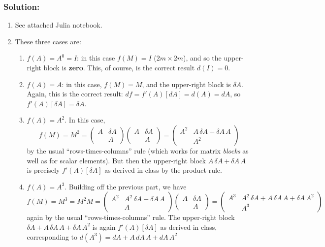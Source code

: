 \documentclass[10pt,oneside]{article}
\begin{document}
\subsubsection*{Solution:}

\begin{enumerate}

    \item See attached Julia notebook. 

    \item These three cases are:
    \begin{enumerate}
    \item $f(A) = A^0 = I$: in this case $f(M) = I$ ($2m \times 2m$), and so the upper-right block is \textbf{zero}.  This, of course, is the correct result $d(I) = 0$.
    \item $f(A) = A$: in this case, $f(M) = M$, and the upper-right block is $\delta A$.  Again, this is the correct result: $df = f'(A)[dA] = d(A) = dA$, so $f'(A)[\delta A] = \delta A$.
    \item $f(A) = A^2$.  In this case, 
    $$
    f(M) = M^2 = \begin{pmatrix} A & \delta A \\ & A \end{pmatrix} \begin{pmatrix} A & \delta A \\ & A \end{pmatrix} = \begin{pmatrix} A^2 & A \, \delta A + \delta A \, A \\ & A^2 \end{pmatrix}
    $$
    by the usual ``rows-times-columns'' rule (which works for matrix \emph{blocks} as well as for scalar elements).  But then the upper-right block $A \, \delta A + \delta A \, A$ is precisely $f'(A)[\delta A]$ as derived in class by the product rule.
    
    \item $f(A) = A^3$.  Building off the previous part, we have 
    $$
    f(M) = M^3 = M^2 M = \begin{pmatrix} A^2 & A^2 \, \delta A + \delta A \, A \\ & A \end{pmatrix} \begin{pmatrix} A & \delta A \\ & A \end{pmatrix} = \begin{pmatrix} A^3 & A^2 \, \delta A + A \, \delta A \, A + \delta A \, A^2 \\ & A^3 \end{pmatrix}
    $$
    again by the usual ``rows-times-columns'' rule.  The upper-right block $\delta A + A \, \delta A \, A + \delta A \, A^2$ is again  $f'(A)[\delta A]$ as derived in class, corresponding to $d(A^3) = d A + A \, d A \, A + d A \, A^2$
    \end{enumerate}


\end{enumerate}
\end{document}
